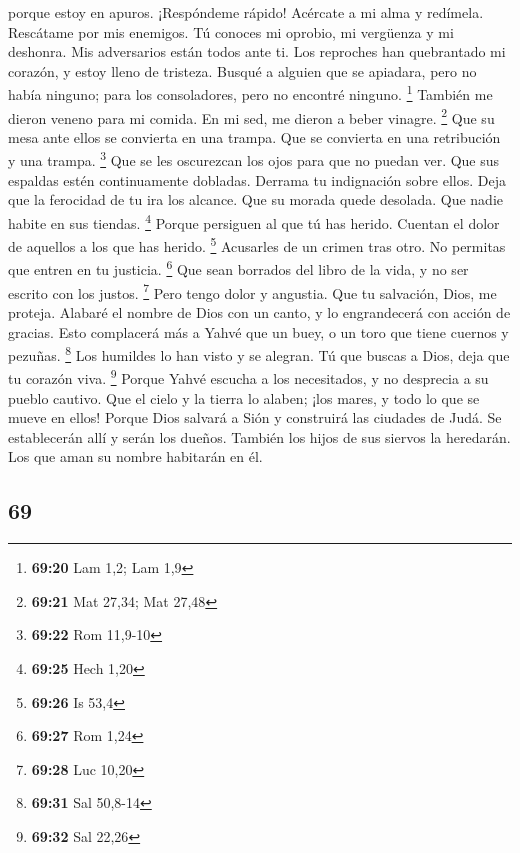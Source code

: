 \begin{paracol}{2}
porque estoy en apuros. ¡Respóndeme rápido!  Acércate a
mi alma y redímela. Rescátame por mis enemigos.  Tú
conoces mi oprobio, mi vergüenza y mi deshonra. Mis adversarios están
todos ante ti.  Los reproches han quebrantado mi corazón,
y estoy lleno de tristeza. Busqué a alguien que se apiadara, pero no
había ninguno; para los consoladores, pero no encontré ninguno.
\footnote{\textbf{69:20} Lam 1,2; Lam 1,9}  También me
dieron veneno para mi comida. En mi sed, me dieron a beber vinagre.
\footnote{\textbf{69:21} Mat 27,34; Mat 27,48}  Que su
mesa ante ellos se convierta en una trampa. Que se convierta en una
retribución y una trampa. \footnote{\textbf{69:22} Rom 11,9-10}
 Que se les oscurezcan los ojos para que no puedan ver.
Que sus espaldas estén continuamente dobladas.  Derrama
tu indignación sobre ellos. Deja que la ferocidad de tu ira los alcance.
 Que su morada quede desolada. Que nadie habite en sus
tiendas. \footnote{\textbf{69:25} Hech 1,20}  Porque
persiguen al que tú has herido. Cuentan el dolor de aquellos a los que
has herido. \footnote{\textbf{69:26} Is 53,4}  Acusarles
de un crimen tras otro. No permitas que entren en tu justicia.
\footnote{\textbf{69:27} Rom 1,24}  Que sean borrados del
libro de la vida, y no ser escrito con los justos. \footnote{\textbf{69:28}
  Luc 10,20}  Pero tengo dolor y angustia. Que tu
salvación, Dios, me proteja.  Alabaré el nombre de Dios
con un canto, y lo engrandecerá con acción de gracias. 
Esto complacerá más a Yahvé que un buey, o un toro que tiene cuernos y
pezuñas. \footnote{\textbf{69:31} Sal 50,8-14}  Los
humildes lo han visto y se alegran. Tú que buscas a Dios, deja que tu
corazón viva. \footnote{\textbf{69:32} Sal 22,26}  Porque
Yahvé escucha a los necesitados, y no desprecia a su pueblo cautivo.
 Que el cielo y la tierra lo alaben; ¡los mares, y todo
lo que se mueve en ellos!  Porque Dios salvará a Sión y
construirá las ciudades de Judá. Se establecerán allí y serán los
dueños.  También los hijos de sus siervos la heredarán.
Los que aman su nombre habitarán en él.

\switchcolumn
\begin{otherlanguage}{english}

\hypertarget{section-137}{%
\section{69}\label{section-137}}


\end{otherlanguage}
\end{paracol}
